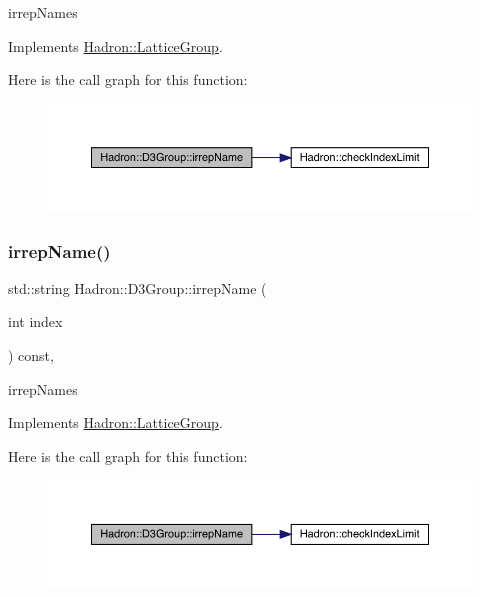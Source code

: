 irrep\+Names 

Implements \mbox{\hyperlink{structHadron_1_1LatticeGroup_a4bc5620218c2a73157e19bc4451fe746}{Hadron\+::\+Lattice\+Group}}.

Here is the call graph for this function\+:
\nopagebreak
\begin{figure}[H]
\begin{center}
\leavevmode
\includegraphics[width=350pt]{de/de1/structHadron_1_1D3Group_a3e60ca3001ddc0176179107cfed2d621_cgraph}
\end{center}
\end{figure}
\mbox{\label{structHadron_1_1D3Group_a3e60ca3001ddc0176179107cfed2d621}} 
\subsubsection{\texorpdfstring{irrepName()}{irrepName()}\hspace{0.1cm}{\footnotesize\ttfamily [3/3]}}
{\footnotesize\ttfamily std\+::string Hadron\+::\+D3\+Group\+::irrep\+Name (\begin{DoxyParamCaption}\item[{int}]{index }\end{DoxyParamCaption}) const\hspace{0.3cm}{\ttfamily [inline]}, {\ttfamily [virtual]}}

irrep\+Names 

Implements \mbox{\hyperlink{structHadron_1_1LatticeGroup_a4bc5620218c2a73157e19bc4451fe746}{Hadron\+::\+Lattice\+Group}}.

Here is the call graph for this function\+:
\nopagebreak
\begin{figure}[H]
\begin{center}
\leavevmode
\includegraphics[width=350pt]{de/de1/structHadron_1_1D3Group_a3e60ca3001ddc0176179107cfed2d621_cgraph}
\end{center}
\end{figure}
\mbox{\label{structHadron_1_1D3Group_a5662028a7fb3554c893609148e6d3eeb}} 
